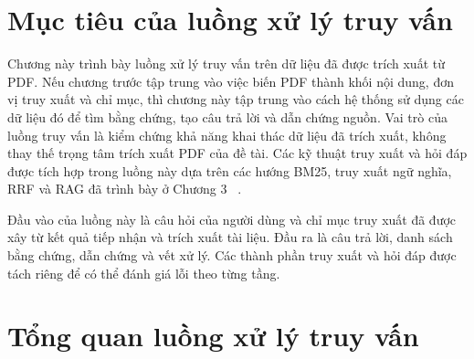 \documentclass[../DoAn.tex]{subfiles}
\begin{document}
\section{Mục tiêu của luồng xử lý truy vấn}
\label{section:query-flow-goal}

Chương này trình bày luồng xử lý truy vấn trên dữ liệu đã được trích xuất từ PDF.
Nếu chương trước tập trung vào việc biến PDF thành khối nội dung, đơn vị truy xuất và chỉ mục, thì
chương này tập trung vào cách hệ thống sử dụng các dữ liệu đó để tìm bằng chứng,
tạo câu trả lời và dẫn chứng nguồn. Vai trò của luồng truy vấn là kiểm chứng khả
năng khai thác dữ liệu đã trích xuất, không thay thế trọng tâm trích xuất PDF của
đề tài. Các kỹ thuật truy xuất và hỏi đáp được tích hợp trong luồng này dựa trên
các hướng BM25, truy xuất ngữ nghĩa, RRF và RAG đã trình bày ở Chương 3~
\cite{robertson2009bm25,karpukhin2020dpr,cormack2009rrf,lewis2020rag}.

Đầu vào của luồng này là câu hỏi của người dùng và chỉ mục truy xuất đã được xây
từ kết quả tiếp nhận và trích xuất tài liệu. Đầu ra là câu trả lời, danh sách bằng chứng, dẫn chứng và vết xử
lý. Các thành phần truy xuất và hỏi đáp được tách riêng để có thể đánh giá lỗi
theo từng tầng.

\section{Tổng quan luồng xử lý truy vấn}
\label{section:query-flow-overview}
\end{document}
